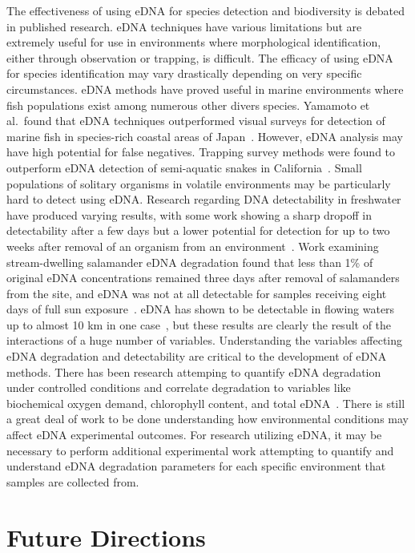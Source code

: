 \documentclass[letterpaper, 10pt, hidelinks]{article}
\begin{document}
The effectiveness of using eDNA for species detection and biodiversity is debated 
in published research. eDNA techniques have various limitations but are extremely 
useful for use in environments where morphological identification, either through 
observation or trapping, is difficult. The efficacy of using eDNA for species 
identification may vary drastically depending on very specific circumstances. 
eDNA methods have proved useful in 
marine environments where fish populations exist among numerous other divers species. Yamamoto 
et al.\ found that eDNA techniques outperformed visual surveys for detection of 
marine fish in species-rich coastal areas of Japan~\cite{Yamamoto2017}. However, 
eDNA analysis may have high potential for false negatives. 
Trapping survey methods were found to outperform eDNA detection of semi-aquatic 
snakes in California~\cite{Rose2019}.
Small populations of 
solitary organisms in volatile environments may be particularly hard to detect using 
eDNA. Research regarding DNA detectability in freshwater have produced varying 
results, with some work showing a sharp dropoff in detectability after a few days 
but a lower potential for detection for up to two weeks after removal of an organism 
from an environment~\cite{Dejean2011}. Work examining stream-dwelling salamander 
eDNA degradation found that less than 1\% of original eDNA concentrations remained 
three days after removal of salamanders from the site, and eDNA was not at all 
detectable for samples receiving eight days of full sun exposure~\cite{Pilliod2014}. 
eDNA has shown to be detectable in flowing waters up to almost 10 km in one 
case~\cite{Deiner2014}, but these results are clearly the result of the interactions 
of a huge number of variables. Understanding the variables affecting eDNA degradation 
and detectability are critical to the development of eDNA methods. There has been 
research attemping to quantify eDNA degradation under controlled conditions and correlate 
degradation to variables like biochemical oxygen demand, chlorophyll content, and 
total eDNA~\cite{Barnes2014}. There is still a great deal of work to be done understanding 
how environmental conditions may affect eDNA experimental outcomes. For research 
utilizing eDNA, it may be necessary to perform additional experimental work attempting 
to quantify and understand eDNA degradation parameters for each specific environment 
that samples are collected from.

\section{Future Directions}


{}
\end{document}
